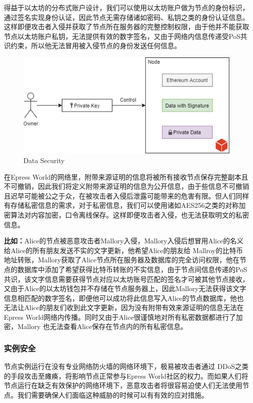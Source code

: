 \documentclass[12pt,a4paper]{extarticle}
\begin{document}
    得益于以太坊的分布式账户设计，我们可以使用以太坊账户做为节点的身份标识，通过签名实现身份认证，因此节点无需存储诸如密码、私钥之类的身份认证信息。这样即便攻击者入侵并获取了节点所在服务器的完整控制权限，由于他并不能获取节点以太坊账户私钥，无法提供有效的数字签名，又由于网络内信息传递受PoS共识约束，所以他无法冒用被入侵节点的身份发送任何信息。

    \begin{figure}[H]
        \centering
        \includegraphics[scale=0.6]{figures-data_security.png}
        \caption{Data Security}
    \end{figure}

    在Epress World的网络里，附带来源证明的信息将被所有接收节点保存完整副本且不可撤销，因此我们将定义附带来源证明的信息为公开信息，由于些信息不可撤销且迟早可能被公之于众，在被攻击者入侵后泄露可能带来的危害有限。但人们同样有存储私密信息的需求，对于私密信息，我们可以使用诸如AES256之类的对称加密算法对内容加密，口令离线保存。这样即便攻击者入侵，也无法获取明文的私密信息。
    ~\newline
    \begin{blockqt}
    \textbf{比如：}Alice的节点被恶意攻击者Mallory入侵，Mallory入侵后想冒用Alice的名义给Alice的所有朋友发送不实的文字更新，他希望Alice的朋友给
    Mallroy的比特币地址转账，Mallory获取了Alice节点所在服务器及数据库的完全访问权限，他在节点的数据库中添加了希望获得比特币转账的不实信息，由于节点间信息传递的PoS共识，该文字信息需要获得节点对应以太坊账号匹配的签名才可被其他节点接收，又由于Alice的以太坊钱包并不存储在节点服务器上，因此Mallory无法获得该文字信息相匹配的数字签名，即便他可以成功将此信息写入Alice的节点数据库，他也无法让Alice的朋友们收到此文字更新，因为没有附带有效来源证明的信息无法在Epress World网络内传播。同时又由于Alice很谨慎地对所有私密数据都进行了加密，Mallory
    也无法查看Alice保存在节点内的所有私密信息。
    \end{blockqt}
\subsubsection{实例安全}
    节点实例运行在没有专业网络防火墙的网络环境下，极易被攻击者通过
    DDoS之类的手段攻击至瘫痪，将影响节点正常参与Epress World社区的权力。而如果人们将节点运行在缺乏有效保护的网络环境下，恶意攻击者将很容易迫使人们无法使用节点。我们需要确保人们面临这种威胁的时候可以有有效的应对措施。
\end{document}
